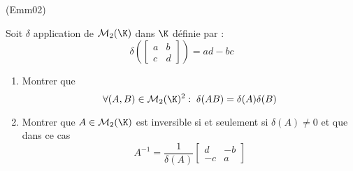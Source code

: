 \begin{tiny}(Emm02)\end{tiny}
Soit $\delta $ application de $\mathcal{M}_{2}(\K)$ dans $\K$ d{\'e}finie par :
\begin{displaymath}
\delta (\left[
\begin{array}{cc}
a & b \\
c & d
\end{array}
\right] )=ad-bc
\end{displaymath}

\begin{enumerate}
\item  Montrer que 
\begin{displaymath}
 \forall (A,B)\in \mathcal{M}_{2}(\K)^{2} :\; \delta (AB)=\delta (A)\delta (B)
\end{displaymath}
\item  Montrer que $A\in \mathcal{M}_{2}(\K)$ est inversible si
et seulement si $\delta (A)\neq 0$ et que dans ce cas
\begin{displaymath}
A^{-1}=\frac{1}{\delta (A)}\left[
\begin{array}{cc}
d & -b \\
-c & a
\end{array}
\right] 
\end{displaymath}
\end{enumerate}
